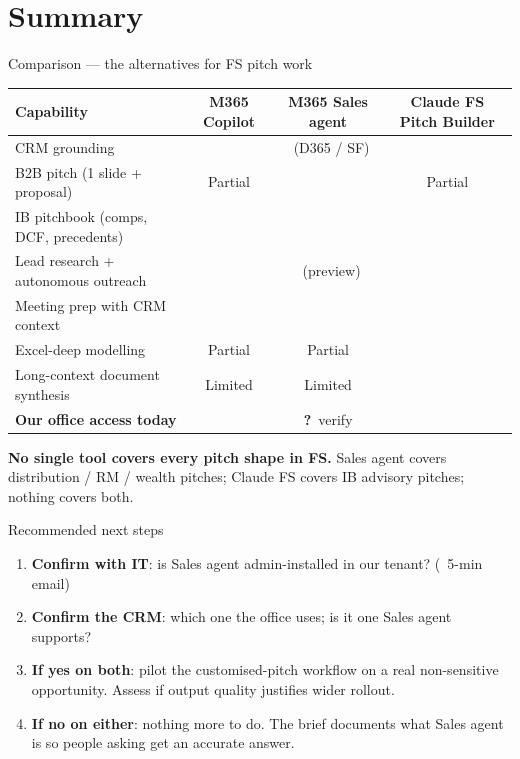 \documentclass[11pt,aspectratio=169]{beamer}
\newcommand{\good}{\textcolor{successgreen}{\checkmark}}
\newcommand{\bad}{\textcolor{warningred}{\textbf{\texttimes}}}
\newcommand{\hl}[1]{\textbf{\textcolor{accentteal}{#1}}}
\begin{document}
\section{Summary}

\begin{frame}{Comparison --- the alternatives for FS pitch work}
  \centering\footnotesize
  \begin{tabular}{lccc}
    \toprule
    \textbf{Capability} & \textbf{M365 Copilot} & \textbf{M365 Sales agent} & \textbf{Claude FS Pitch Builder} \\
    \midrule
    CRM grounding                          & \bad        & \good\ (D365 / SF) & \bad \\
    B2B pitch (1 slide + proposal)         & Partial     & \good        & Partial \\
    IB pitchbook (comps, DCF, precedents)  & \bad        & \bad         & \good \\
    Lead research + autonomous outreach    & \bad        & \good\ (preview) & \bad \\
    Meeting prep with CRM context          & \bad        & \good        & \bad \\
    Excel-deep modelling                   & Partial     & Partial      & \good \\
    Long-context document synthesis        & Limited     & Limited      & \good \\
    \midrule
    \textbf{Our office access today}       & \good       & \textbf{?}\ verify & \bad \\
    \bottomrule
  \end{tabular}

  \vfill
  \raggedright \small \hl{No single tool covers every pitch shape in FS.} Sales agent covers distribution / RM / wealth pitches; Claude FS covers IB advisory pitches; nothing covers both.
\end{frame}

\begin{frame}{Recommended next steps}
  \begin{enumerate}
    \item \textbf{Confirm with IT}: is Sales agent admin-installed in our tenant? (~5-min email)
    \item \textbf{Confirm the CRM}: which one the office uses; is it one Sales agent supports?
    \item \textbf{If yes on both}: pilot the customised-pitch workflow on a real non-sensitive opportunity. Assess if output quality justifies wider rollout.
    \item \textbf{If no on either}: nothing more to do. The brief documents what Sales agent is so people asking get an accurate answer.
  \end{enumerate}
\end{frame}
\end{document}
